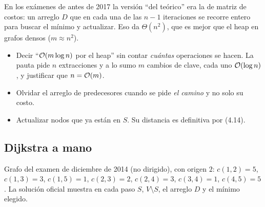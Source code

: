 En los exámenes de antes de 2017 la versión ``del teórico'' era la de matriz de costos: un arreglo $D$ que en cada una de las $n-1$ iteraciones se recorre entero para buscar el mínimo y actualizar. Eso da $\Theta(n^2)$, que es mejor que el heap en grafos densos ($m\approx n^2$).

\begin{trampa}[implementación]
\begin{itemize}
  \item Decir ``$\mathcal{O}(m\log n)$ por el heap'' sin contar \emph{cuántas} operaciones se hacen. La pauta pide $n$ extracciones y a lo sumo $m$ cambios de clave, cada uno $\mathcal{O}(\log n)$, y justificar que $n=\mathcal{O}(m)$.
  \item Olvidar el arreglo de predecesores cuando se pide \emph{el camino} y no solo su costo.
  \item Actualizar nodos que ya están en $S$. Su distancia es definitiva por (4.14).
\end{itemize}
\end{trampa}

\subsection{Dijkstra a mano}

Grafo del examen de diciembre de 2014 (no dirigido), con origen $2$: $c(1,2)=5$, $c(1,3)=3$, $c(1,5)=1$, $c(2,3)=2$, $c(2,4)=3$, $c(3,4)=1$, $c(4,5)=5$. La solución oficial muestra en cada paso $S$, $V\setminus S$, el arreglo $D$ y el mínimo elegido.

\begin{center}
\end{center}

